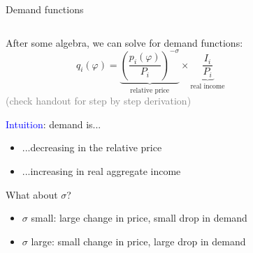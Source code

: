 \documentclass[notes,11pt, aspectratio=169, xcolor=table]{beamer}
\newcommand{\blue}[1]{\textcolor{blue}{#1}}
\newenvironment{wideitemize}{\itemize\addtolength{\itemsep}{10pt}}{\enditemize}
\begin{document}
\begin{frame}{Demand functions}
\begin{columns}
    \begin{column}{0.5\textwidth}
       After some algebra, we can solve for demand functions:            
        \begin{equation*}
            q_i(\varphi) = \underbrace{\left( \frac{p_i(\varphi)}{P_i} \right)^{-\sigma}}_{\text{relative price}} \times \underbrace{\frac{I_i}{P_i}}_{\text{real income}}
            \end{equation*}
        {\scriptsize \qquad \textcolor{gray}{(check handout for step by step derivation)}}

       \begin{wideitemize}
        \item<2-> \blue{Intuition}: demand is...
        \begin{itemize}
            \item ...decreasing in the relative price
            \item ...increasing in real aggregate income
        \end{itemize}        

        \item<3-> What about $\sigma$?
        \begin{itemize}
            \item<4-> $\sigma$ small: large change in price, small drop in demand
            \item<5-> $\sigma$ large: small change in price, large drop in demand
        \end{itemize}
        \end{wideitemize}


    \end{column}
    
    \begin{column}{0.5\textwidth}
\end{column}
\end{columns}
\end{frame}
\end{document}
